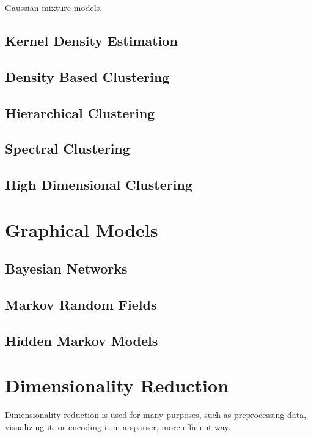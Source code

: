 \documentclass{article}
\begin{document}
    Gaussian mixture models. 

  \subsection{Kernel Density Estimation} 

  \subsection{Density Based Clustering}

  \subsection{Hierarchical Clustering} 

  \subsection{Spectral Clustering}

  \subsection{High Dimensional Clustering}

\section{Graphical Models} 

  \subsection{Bayesian Networks} 

  \subsection{Markov Random Fields}

  \subsection{Hidden Markov Models}

\section{Dimensionality Reduction} 

  Dimensionality reduction is used for many purposes, such as preprocessing data, visualizing it, or encoding it in a sparser, more efficient way. 
\end{document}
